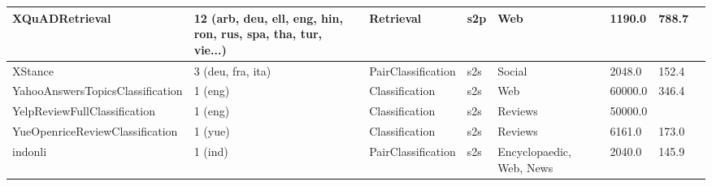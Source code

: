 \begin{longtable}{L{5.0cm}|L{1.5cm}L{1.4cm}L{1.4cm}L{1.4cm}L{1.4cm}L{1.0cm}L{1.0cm}}
 \hline 
XQuADRetrieval \cite{Artetxe:etal:2019} & 12 (arb, deu, ell, eng, hin, ron, rus, spa, tha, tur, vie...) & Retrieval & s2p & Web & 1190.0 & 788.7 \\
 \hline 
XStance \cite{vamvas2020xstance} & 3 (deu, fra, ita) & PairClassification & s2s & Social & 2048.0 & 152.4 \\
 \hline 
YahooAnswersTopicsClassification \cite{NIPS2015_250cf8b5} & 1 (eng) & Classification & s2s & Web & 60000.0 & 346.4 \\
 \hline 
YelpReviewFullClassification \cite{NIPS2015_250cf8b5} & 1 (eng) & Classification & s2s & Reviews & 50000.0 &  \\
 \hline 
YueOpenriceReviewClassification \cite{xiang2019sentiment} & 1 (yue) & Classification & s2s & Reviews & 6161.0 & 173.0 \\
 \hline 
indonli \cite{mahendra-etal-2021-indonli} & 1 (ind) & PairClassification & s2s & Encyclopaedic, Web, News & 2040.0 & 145.9 \\
 \hline 
\end{longtable}